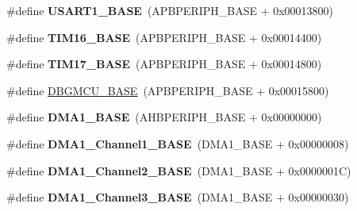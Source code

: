 \begin{DoxyCompactItemize}
\item 
\mbox{\label{group___peripheral__memory__map_ga86162ab3f740db9026c1320d46938b4d}} 
\#define {\bfseries U\+S\+A\+R\+T1\+\_\+\+B\+A\+SE}~(A\+P\+B\+P\+E\+R\+I\+P\+H\+\_\+\+B\+A\+SE + 0x00013800)
\item 
\mbox{\label{group___peripheral__memory__map_ga16c97093a531d763b0794c3e6d09e1bf}} 
\#define {\bfseries T\+I\+M16\+\_\+\+B\+A\+SE}~(A\+P\+B\+P\+E\+R\+I\+P\+H\+\_\+\+B\+A\+SE + 0x00014400)
\item 
\mbox{\label{group___peripheral__memory__map_gaffbedbe30e8c4cffdea326d6c1800574}} 
\#define {\bfseries T\+I\+M17\+\_\+\+B\+A\+SE}~(A\+P\+B\+P\+E\+R\+I\+P\+H\+\_\+\+B\+A\+SE + 0x00014800)
\item 
\#define \hyperlink{group___peripheral__memory__map_ga4adaf4fd82ccc3a538f1f27a70cdbbef}{D\+B\+G\+M\+C\+U\+\_\+\+B\+A\+SE}~(A\+P\+B\+P\+E\+R\+I\+P\+H\+\_\+\+B\+A\+SE + 0x00015800)
\item 
\mbox{\label{group___peripheral__memory__map_gab2d8a917a0e4ea99a22ac6ebf279bc72}} 
\#define {\bfseries D\+M\+A1\+\_\+\+B\+A\+SE}~(A\+H\+B\+P\+E\+R\+I\+P\+H\+\_\+\+B\+A\+SE + 0x00000000)
\item 
\mbox{\label{group___peripheral__memory__map_ga888dbc1608243badeb3554ffedc7364c}} 
\#define {\bfseries D\+M\+A1\+\_\+\+Channel1\+\_\+\+B\+A\+SE}~(D\+M\+A1\+\_\+\+B\+A\+SE + 0x00000008)
\item 
\mbox{\label{group___peripheral__memory__map_ga38a70090eef3687e83fa6ac0c6d22267}} 
\#define {\bfseries D\+M\+A1\+\_\+\+Channel2\+\_\+\+B\+A\+SE}~(D\+M\+A1\+\_\+\+B\+A\+SE + 0x0000001\+C)
\item 
\mbox{\label{group___peripheral__memory__map_ga70b3d9f36ca9ce95b4e421c11154fe5d}} 
\#define {\bfseries D\+M\+A1\+\_\+\+Channel3\+\_\+\+B\+A\+SE}~(D\+M\+A1\+\_\+\+B\+A\+SE + 0x00000030)
\item 
\mbox{\label{group___peripheral__memory__map_ga1adc93cd0baf0897202c71110e045692}} 

\end{DoxyCompactItemize}
